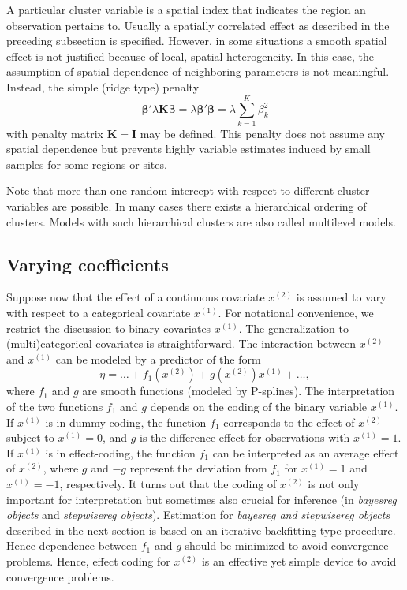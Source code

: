 \documentclass[11pt,a4paper,twoside]{bayesxarticle}
\def \Kvec {\vec{K}}
\def \betavec {\boldsymbol{\beta}}
\def \Kvec {\mathbf{K}}
\def \Ivec {\mathbf{I}}
\begin{document}
A particular cluster variable is a spatial index that indicates the region an observation pertains to. Usually a spatially correlated effect
as described in the preceding subsection is specified.
However, in some situations a smooth spatial effect is not justified because of local, spatial heterogeneity. In this case,
the assumption of spatial dependence of neighboring parameters is not meaningful. Instead, the simple (ridge type) penalty
$$
\betavec' \lambda \Kvec \betavec = \lambda \betavec'  \betavec = \lambda \sum_{k=1}^{K} \beta_k^2
$$
with penalty matrix $\Kvec = \Ivec$ may be defined. This penalty does not assume any spatial dependence but prevents highly variable
estimates induced by small samples for some regions or sites.

Note that more than one random intercept with respect to different
cluster variables are possible. In many cases there exists a
hierarchical ordering of clusters. Models with such hierarchical
clusters are also called multilevel models.


\subsection{Varying coefficients}
\label{varcoeff_terms}

Suppose now that the effect of a continuous covariate $x^{(2)}$ is assumed to vary with
respect to a categorical covariate $x^{(1)}$. For notational convenience, we restrict the discussion to binary covariates $x^{(1)}$.
The generalization to (multi)categorical covariates is straightforward.
The interaction between $x^{(2)}$ and
$x^{(1)}$ can be modeled by a predictor of the form
$$
\eta = \ldots + f_1(x^{(2)}) + g(x^{(2)}) x^{(1)} + \ldots,
$$
where $f_1$ and $g$ are smooth functions (modeled by P-splines). The
interpretation of the two functions $f_1$ and $g$ depends on the
coding of the binary variable $x^{(1)}$. If $x^{(1)}$ is in
dummy-coding, the function $f_1$ corresponds to the effect of
$x^{(2)}$ subject to  $x^{(1)}=0$, and $g$ is the difference effect
for observations with $x^{(1)}=1$. If $x^{(1)}$ is in effect-coding,
the function $f_1$ can be interpreted as an average effect of
$x^{(2)}$, where $g$ and $-g$ represent the deviation from $f_1$ for
$x^{(1)} = 1$ and $x^{(1)} = -1$, respectively. It turns out that
the coding of $x^{(2)}$ is not only important  for interpretation
but sometimes also crucial for inference (in {\em bayesreg objects}
and {\em stepwisereg objects}). Estimation for {\em bayesreg and
stepwisereg objects} described in the next section is based on an
iterative backfitting type procedure. Hence dependence between $f_1$
and $g$ should be minimized to avoid convergence problems. Hence,
effect coding for $x^{(2)}$ is an effective yet simple device to
avoid convergence problems.
\end{document}

